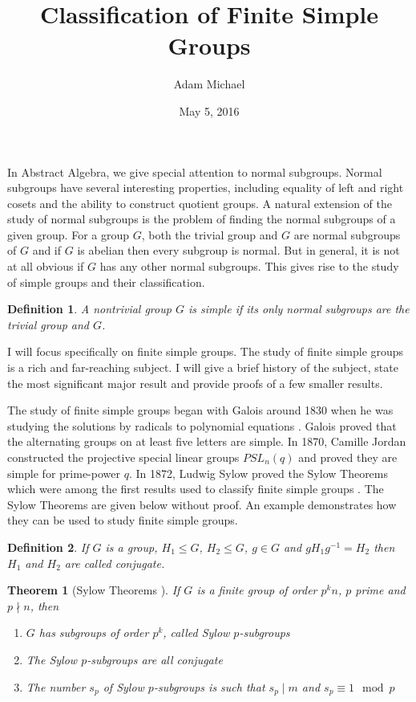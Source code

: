 \documentclass[a4paper]{article}
\title{Classification of Finite Simple Groups}
\author{Adam Michael}
\date{May 5, 2016}
\begin{document}
\maketitle

\newtheorem{theorem}{Theorem}
\newtheorem{lemma}{Lemma}
\newtheorem{definition}{Definition}
\newtheorem{example}{Example}

In Abstract Algebra, we give special attention to normal subgroups. Normal subgroups have several interesting properties, including equality of left and right cosets and the ability to construct quotient groups. A natural extension of the study of normal subgroups is the problem of finding the normal subgroups of a given group. For a group $G$, both the trivial group and $G$ are normal subgroups of $G$ and if $G$ is abelian then every subgroup is normal. But in general, it is not at all obvious if $G$ has any other normal subgroups. This gives rise to the study of simple groups and their classification.

\begin{definition}
A nontrivial group $G$ is simple if its only normal subgroups are the trivial group and $G$.
\end{definition}

I will focus specifically on finite simple groups. The study of finite simple groups is a rich and far-reaching subject. I will give a brief history of the subject, state the most significant major result and provide proofs of a few smaller results.

The study of finite simple groups began with Galois around 1830 when he was studying the solutions by radicals to polynomial equations \cite{gallian}. Galois proved that the alternating groups on at least five letters are simple. In 1870, Camille Jordan constructed the projective special linear  groups $PSL_n(q)$ and proved they are simple for prime-power $q$. In 1872, Ludwig Sylow proved the Sylow Theorems which were among the first results used to classify finite simple groups \cite{wilson}. The Sylow Theorems are given below without proof. An example demonstrates how they can be used to study finite simple groups.

\begin{definition}
If $G$ is a group, $H_1 \le G$, $H_2 \le G$, $g \in G$ and $g H_1 g^{-1} = H_2$ then $H_1$ and $H_2$ are called conjugate.
\end{definition}

\begin{theorem}[Sylow Theorems \cite{wilson}]
If $G$ is a finite group of order $p^k n$, $p$ prime and $p \nmid n$, then
\begin{enumerate}
	\item $G$ has subgroups of order $p^k$, called Sylow $p$-subgroups
	\item The Sylow $p$-subgroups are all conjugate
	\item The number $s_p$ of Sylow $p$-subgroups is such that $s_p \mid m$ and $s_p \equiv 1 \mod p$	
\end{enumerate}
\end{theorem}
\end{document}
